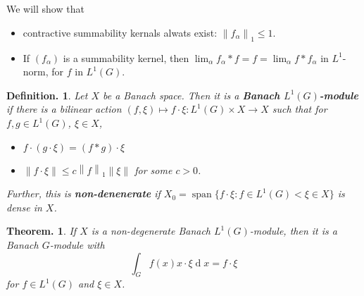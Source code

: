 \documentclass[11pt, a4paper]{memoir}
\newcommand{\norm}[1]{\ensuremath{\left\lVert#1\right\rVert}}
\theoremstyle{change}
\newtheorem{theorem}{Theorem.}[section]
\theoremstyle{plain}
\theoremstyle{nonumberplain}
\newtheorem{definition}{Definition.}
\DeclareMathOperator{\spn}{span}
\renewcommand{\d}[1]{\ensuremath{\operatorname{d}\!{#1}}}
\newcommand{\defn}[1]{{\boldmath\bfseries #1}}
\numberwithin{equation}{section}
\begin{document}
We will show that
\begin{itemize}[nl]
    \item contractive summability kernals alwats exist: $\norm{f_\alpha}_1\leq 1$.
    \item If $(f_\alpha)$ is a summability kernel, then $\lim_\alpha f_\alpha*f=f=\lim_\alpha f*f_\alpha$ in $L^1$-norm, for $f$ in $L^1(G)$.
\end{itemize}
\begin{definition}
    Let $X$ be a Banach space.
    Then it is a \defn{Banach $L^1(G)$-module} if there is a bilinear action $(f,\xi)\mapsto f\cdot\xi:L^1(G)\times X\to X$ such that for $f,g\in L^1(G)$, $\xi\in X$,
    \begin{itemize}[nl]
        \item $f\cdot(g\cdot\xi)=(f*g)\cdot\xi$
        \item $\norm{f\cdot\xi}\leq c\norm{f}_1\norm{\xi}$ for some $c>0$.
    \end{itemize}
    Further, this is \defn{non-denenerate} if $X_0=\spn\{f\cdot\xi:f\in L^1(G)<\xi\in X\}$ is dense in $X$.
\end{definition}
\begin{theorem}
    If $X$ is a non-degenerate Banach $L^1(G)$-module, then it is a Banach $G$-module with
    \begin{equation*}
        \int_Gf(x)x\cdot\xi\d{x}=f\cdot\xi
    \end{equation*}
    for $f\in L^1(G)$ and $\xi\in X$.
\end{theorem}
\end{document}
